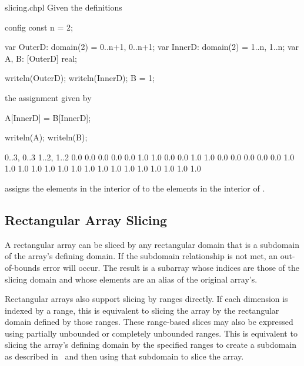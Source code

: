 \begin{chapelexample}{slicing.chpl}
Given the definitions
\begin{chapelpre}
config const n = 2;
\end{chapelpre}
\begin{chapel}
var OuterD: domain(2) = {0..n+1, 0..n+1};
var InnerD: domain(2) = {1..n, 1..n};
var A, B: [OuterD] real;
\end{chapel}
\begin{chapelnoprint}
writeln(OuterD);
writeln(InnerD);
B = 1;
\end{chapelnoprint}
the assignment given by
\begin{chapel}
A[InnerD] = B[InnerD];
\end{chapel}
\begin{chapelpost}
writeln(A);
writeln(B);
\end{chapelpost}
\begin{chapeloutput}
{0..3, 0..3}
{1..2, 1..2}
0.0 0.0 0.0 0.0
0.0 1.0 1.0 0.0
0.0 1.0 1.0 0.0
0.0 0.0 0.0 0.0
1.0 1.0 1.0 1.0
1.0 1.0 1.0 1.0
1.0 1.0 1.0 1.0
1.0 1.0 1.0 1.0
\end{chapeloutput}
assigns the elements in the interior of  to the elements in
the interior of .
\end{chapelexample}

\subsection{Rectangular Array Slicing}
\label{Rectangular_Array_Slicing}

A rectangular array can be sliced by any rectangular domain that is a
subdomain of the array's defining domain.  If the subdomain
relationship is not met, an out-of-bounds error will occur.  The
result is a subarray whose indices are those of the slicing domain and
whose elements are an alias of the original array's.

Rectangular arrays also support slicing by ranges directly.  If each
dimension is indexed by a range, this is equivalent to slicing the
array by the rectangular domain defined by those ranges.  These
range-based slices may also be expressed using partially unbounded or
completely unbounded ranges.  This is equivalent to slicing the
array's defining domain by the specified ranges to create a subdomain
as described in~ and then using that subdomain to slice
the array.

